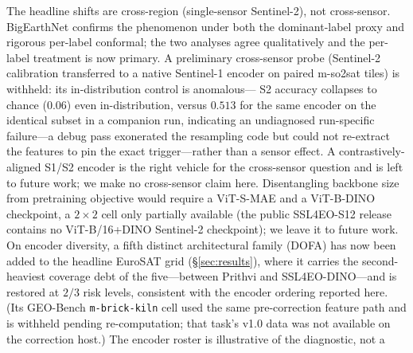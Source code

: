\documentclass[journal]{IEEEtran}
\renewcommand{\_}{\textunderscore\allowbreak}
\begin{document}
The headline shifts are cross-region (single-sensor Sentinel-2), not
cross-sensor. BigEarthNet confirms the phenomenon under both the dominant-label proxy and rigorous
per-label conformal; the two analyses agree qualitatively and the per-label treatment is now primary.
A preliminary cross-sensor probe (Sentinel-2 calibration transferred to a native Sentinel-1 encoder on
paired m-so2sat tiles) is withheld: its in-distribution control is anomalous---
S2 accuracy collapses to chance ($0.06$) even in-distribution, versus $0.513$ for the same encoder on the
identical subset in a companion run, indicating an undiagnosed run-specific failure---a debug pass
exonerated the resampling code but could not re-extract the features to pin the exact trigger---rather
than a sensor effect. A
contrastively-aligned S1/S2 encoder is the right vehicle for the cross-sensor question and is left to future
work; we make no cross-sensor claim here. Disentangling backbone size from pretraining objective would
require a ViT-S-MAE and a ViT-B-DINO checkpoint, a $2\times2$ cell only partially available (the public
SSL4EO-S12 release contains no ViT-B/16+DINO Sentinel-2 checkpoint); we leave it to future work. On encoder
diversity, a fifth distinct architectural family (DOFA) has now been added to the headline EuroSAT grid
(\S\ref{sec:results}), where it carries the second-heaviest coverage debt of the five---between Prithvi and
SSL4EO-DINO---and is restored at $2/3$ risk levels, consistent with the encoder ordering reported here. (Its
GEO-Bench \texttt{m-brick-kiln} cell used the same pre-correction feature path and is withheld pending
re-computation; that task's v1.0 data was not available on the correction host.) The encoder roster is illustrative of the diagnostic, not a
\end{document}
